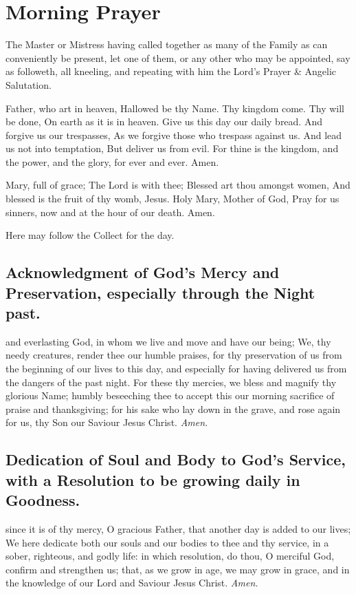 \fancyhead[RO,LE]{}\label{Family}
\fancyhead[RE,LO]{}
\section{Morning Prayer}
\begin{secrubric}
    The Master or Mistress having called together as many of the Family as can conveniently be present, let one of them, or any other who may be appointed, say as followeth, all kneeling, and repeating with him the Lord's Prayer \& Angelic Salutation.
\end{secrubric}
 Father, who art in heaven, Hallowed be thy Name. Thy kingdom come. Thy will be done, On earth as it is in heaven. Give us this day our daily bread. And forgive us our trespasses, As we forgive those who trespass against us. And lead us not into temptation, But deliver us from evil. For thine is the kingdom, and the power, and the glory, for ever and ever. Amen.\par
{} Mary, full of grace; The Lord is with thee; Blessed art thou amongst women, And blessed is the fruit of thy womb, Jesus. Holy Mary, Mother of God, Pray for us sinners, now and at the hour of our death. Amen.
\begin{rubric}
    Here may follow the Collect for the day.
\end{rubric}
\subsection{Acknowledgment of God's Mercy and Preservation, especially through the Night past.}
 and everlasting God, in whom we live and move and have our being; We, thy needy creatures, render thee our humble praises, for thy preservation of us from the beginning of our lives to this day, and especially for having delivered us from the dangers of the past night. For these thy mercies, we bless and magnify thy glorious Name; humbly beseeching thee to accept this our morning sacrifice of praise and thanksgiving; for his sake who lay down in the grave, and rose again for us, thy Son our Saviour Jesus Christ. \textit{Amen.}
\subsection{Dedication of Soul and Body to God's Service, with a Resolution to be growing daily in Goodness.}
 since it is of thy mercy, O gracious Father, that another day is added to our lives; We here dedicate both our souls and our bodies to thee and thy service, in a sober, righteous, and godly life: in which resolution, do thou, O merciful God, confirm and strengthen us; that, as we grow in age, we may grow in grace, and in the knowledge of our Lord and Saviour Jesus Christ. \textit{Amen.}

